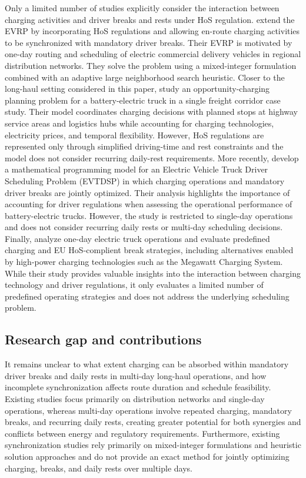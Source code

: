 \documentclass[3p,11pt,authoryear]{elsarticle}  %
\begin{document}
Only a limited number of studies explicitly consider the interaction between charging activities and driver breaks and rests under HoS regulation. \citet{schiffer2017impact} extend the EVRP by incorporating HoS regulations and allowing en-route charging activities to be synchronized with mandatory driver breaks. Their EVRP is motivated by one-day routing and scheduling of electric commercial delivery vehicles in regional distribution networks. They solve the problem using a mixed-integer formulation combined with an adaptive large neighborhood search heuristic.
Closer to the long-haul setting considered in this paper, \citet{wan2024longhaul} study an opportunity-charging planning problem for a battery-electric truck in a single freight corridor case study. Their model coordinates charging decisions with planned stops at highway service areas and logistics hubs while accounting for charging technologies, electricity prices, and temporal flexibility. However, HoS regulations are represented only through simplified driving-time and rest constraints and the model does not consider recurring daily-rest requirements.
More recently, \citet{brockmann2025breakandcharge} develop a mathematical programming model for an Electric Vehicle Truck Driver Scheduling Problem (EVTDSP) in which charging operations and mandatory driver breaks are jointly optimized. %
Their analysis highlights the importance of accounting for driver regulations when assessing the operational performance of battery-electric trucks. However, the study is restricted to single-day operations and does not consider recurring daily rests or multi-day scheduling decisions.
Finally, \citet{schneider2023novel} analyze one-day electric truck operations and evaluate predefined charging and EU HoS-complient break strategies, including alternatives enabled by high-power charging technologies such as the Megawatt Charging System. While their study provides valuable insights into the interaction between charging technology and driver regulations, it only evaluates a limited number of predefined operating strategies and does not address the underlying scheduling problem.




\subsection{Research gap and contributions}

It remains unclear to what extent charging can be absorbed within mandatory driver breaks and daily rests in multi-day long-haul operations, and how incomplete synchronization affects route duration and schedule feasibility. Existing studies focus primarily on distribution networks and single-day operations, whereas multi-day operations involve repeated charging, mandatory breaks, and recurring daily rests, creating greater potential for both synergies and conflicts between energy and regulatory requirements. Furthermore, existing synchronization studies rely primarily on mixed-integer formulations and heuristic solution approaches and do not provide an exact method for jointly optimizing charging, breaks, and daily rests over multiple days.
\end{document}
